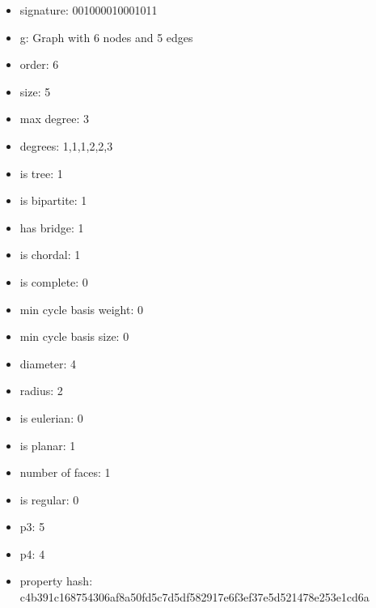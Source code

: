 \begin{itemize}
\item signature: 001000010001011
\item g: Graph with 6 nodes and 5 edges
\item order: 6
\item size: 5
\item max degree: 3
\item degrees: 1,1,1,2,2,3
\item is tree: 1
\item is bipartite: 1
\item has bridge: 1
\item is chordal: 1
\item is complete: 0
\item min cycle basis weight: 0
\item min cycle basis size: 0
\item diameter: 4
\item radius: 2
\item is eulerian: 0
\item is planar: 1
\item number of faces: 1
\item is regular: 0
\item p3: 5
\item p4: 4
\item property hash: c4b391c168754306af8a50fd5c7d5df582917e6f3ef37e5d521478e253e1cd6a
\end{itemize}
\newpage
\begin{figure}
\end{figure}

